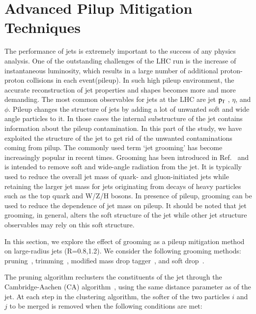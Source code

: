 \newcommand{\pt}{ p_{T}}


\chapter{Advanced Pilup Mitigation Techniques  \label{ Advanced Pilup Mitigation Techniques}}



The performance of jets is extremely important to the success of any physics analysis. One of the outstanding challenges of the LHC run is the increase of instantaneous luminosity, which results in a large number of additional proton-proton collisions in each event(pileup). In such high pileup environment, the accurate reconstruction of jet properties and shapes becomes more and more demanding. The most common observables for jets at the LHC are jet $\rm p_{T}$ , $\eta$, and $\phi$. Pileup changes the structure of jets by adding a lot of unwanted soft and wide angle particles to it. In those cases the internal substructure of the jet contains information about the pileup contamination. In this part of the study, we have exploited the structure of the jet to get rid of the unwanted contaminations coming from pilup. The commonly used term `jet grooming' has become increasingly popular in recent times. Grooming has been introduced in Ref.~\cite{Butterworth:2008tr} and is intended to remove soft and wide-angle radiation from the jet. It is typically used to reduce the overall jet mass of quark- and gluon-initiated jets while retaining the larger jet mass for jets originating from decays of heavy particles
such as the top quark and W/Z/H bosons. In presence of pileup, grooming can be used to reduce the dependence of jet mass on pileup.  
It should be noted that jet grooming, in general, alters the soft structure of the jet while other jet structure observables may rely on this soft structure.  

In this section, we explore the effect of grooming as a pileup mitigation method on large-radius jets (R=0.8,1.2).
We consider the following grooming methods: pruning~\cite{Ellis:2009me}, trimming~\cite{Krohn:2009th}, modified mass drop tagger~\cite{Dasgupta:2013ihk}, and soft drop~\cite{Larkoski:2014wba}.

The pruning algorithm reclusters the constituents of the jet through the Cambridge-Aachen (CA) algorithm~\cite{Dokshitzer:1997in}, using the same distance parameter as of the jet. At each step in the clustering algorithm, the softer of the two particles $i$ and $j$ to be merged is removed when the following conditions are met:

